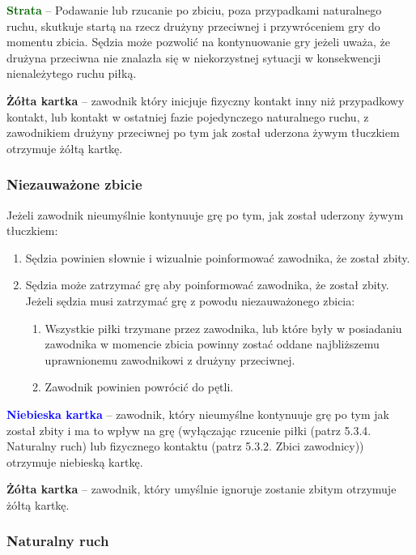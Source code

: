 \documentclass[12pt]{article}
\newcommand\yellowcard[1]{\bgroup\textcolor{darkyellow}{\textbf{#1}}}
\newcommand\bluecard[1]{\bgroup\textcolor{blue}{\textbf{#1}}}
\newcommand\other[1]{\bgroup\textcolor{darkgreen}{\textbf{#1}}}
\begin{document}
\other{Strata} -- Podawanie lub rzucanie po zbiciu, poza przypadkami
naturalnego ruchu, skutkuje startą na rzecz drużyny przeciwnej i
przywróceniem gry do momentu zbicia. Sędzia może pozwolić na
kontynuowanie gry jeżeli uważa, że drużyna przeciwna nie znalazła się w
niekorzystnej sytuacji w konsekwencji nienależytego ruchu piłką.

\yellowcard{Żółta kartka} -- zawodnik który inicjuje fizyczny kontakt inny niż
przypadkowy kontakt, lub kontakt w ostatniej fazie pojedynczego
naturalnego ruchu, z zawodnikiem drużyny przeciwnej po tym jak został
uderzona żywym tłuczkiem otrzymuje żółtą kartkę.

\subsubsection{Niezauważone zbicie}

Jeżeli zawodnik nieumyślnie kontynuuje grę po tym, jak został uderzony
żywym tłuczkiem:
\begin{enumerate}
	\item Sędzia powinien słownie i wizualnie poinformować zawodnika, że został
	      zbity.

	\item Sędzia może zatrzymać grę aby poinformować zawodnika, że został
	      zbity. Jeżeli sędzia musi zatrzymać grę z powodu niezauważonego zbicia:
	      \begin{enumerate}
		      \item Wszystkie piłki trzymane przez zawodnika, lub które były w posiadaniu
		            zawodnika w momencie zbicia powinny zostać oddane najbliższemu
		            uprawnionemu zawodnikowi z drużyny przeciwnej.

		      \item Zawodnik powinien powrócić do pętli.
	      \end{enumerate}
\end{enumerate}

\bluecard{Niebieska kartka} -- zawodnik, który nieumyślne kontynuuje grę po
tym jak został zbity i ma to wpływ na grę (wyłączając rzucenie piłki
(patrz 5.3.4. Naturalny ruch) lub fizycznego kontaktu (patrz 5.3.2.
Zbici zawodnicy)) otrzymuje niebieską kartkę.

\yellowcard{Żółta kartka} -- zawodnik, który umyślnie ignoruje zostanie zbitym
otrzymuje żółtą kartkę.

\subsubsection{Naturalny ruch}
\end{document}
